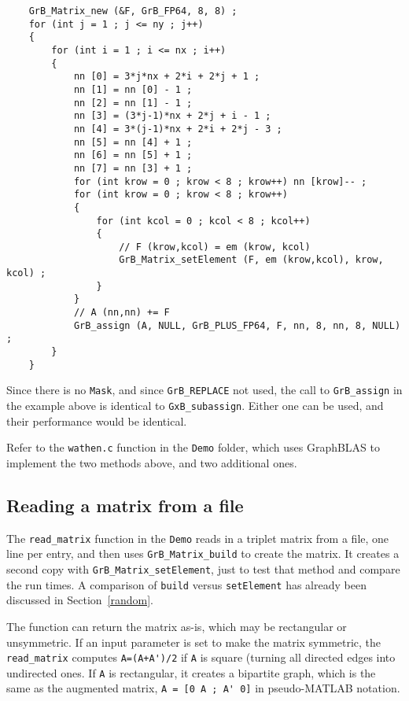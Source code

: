 \documentclass[12pt]{article}
\begin{document}
    {\footnotesize
    \begin{verbatim}
    GrB_Matrix_new (&F, GrB_FP64, 8, 8) ;
    for (int j = 1 ; j <= ny ; j++)
    {
        for (int i = 1 ; i <= nx ; i++)
        {
            nn [0] = 3*j*nx + 2*i + 2*j + 1 ;
            nn [1] = nn [0] - 1 ;
            nn [2] = nn [1] - 1 ;
            nn [3] = (3*j-1)*nx + 2*j + i - 1 ;
            nn [4] = 3*(j-1)*nx + 2*i + 2*j - 3 ;
            nn [5] = nn [4] + 1 ;
            nn [6] = nn [5] + 1 ;
            nn [7] = nn [3] + 1 ;
            for (int krow = 0 ; krow < 8 ; krow++) nn [krow]-- ;
            for (int krow = 0 ; krow < 8 ; krow++)
            {
                for (int kcol = 0 ; kcol < 8 ; kcol++)
                {
                    // F (krow,kcol) = em (krow, kcol)
                    GrB_Matrix_setElement (F, em (krow,kcol), krow, kcol) ;
                }
            }
            // A (nn,nn) += F
            GrB_assign (A, NULL, GrB_PLUS_FP64, F, nn, 8, nn, 8, NULL) ;
        }
    } \end{verbatim}}

Since there is no \verb'Mask', and since \verb'GrB_REPLACE' not used, the call
to \verb'GrB_assign' in the example above is identical to \verb'GxB_subassign'.
Either one can be used, and their performance would be identical.

Refer to the \verb'wathen.c' function in the \verb'Demo' folder, which
uses GraphBLAS to implement the two methods above, and two additional ones.

\newpage
\subsection{Reading a matrix from a file}
\label{read}

The \verb'read_matrix' function in the \verb'Demo' reads in a triplet matrix
from a file, one line per entry, and then uses \verb'GrB_Matrix_build' to
create the matrix.  It creates a second copy with \verb'GrB_Matrix_setElement',
just to test that method and compare the run times.  A comparison of
\verb'build' versus \verb'setElement' has already been discussed in
Section~\ref{random}.

The function can return the matrix as-is, which may be rectangular or
unsymmetric.  If an input parameter is set to make the matrix symmetric, the
\verb'read_matrix' computes \verb"A=(A+A')/2" if \verb'A' is square (turning
all directed edges into undirected ones.  If \verb'A' is rectangular, it
creates a bipartite graph, which is the same as the augmented matrix,
\verb"A = [0 A ; A' 0]" in pseudo-MATLAB notation.
\end{document}
